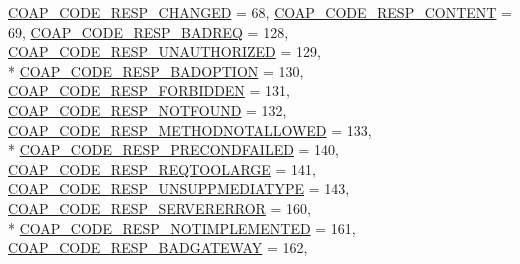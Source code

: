 \begin{DoxyCompactItemize}
\hyperlink{group__open_coap_ggae99fde61d59e68af70c6bcd0c7b0256fac980e3068cfccc3a5b3c08fc847ed349}{C\+O\+A\+P\+\_\+\+C\+O\+D\+E\+\_\+\+R\+E\+S\+P\+\_\+\+C\+H\+A\+N\+G\+ED} = 68, 
\hyperlink{group__open_coap_ggae99fde61d59e68af70c6bcd0c7b0256fa27e8e136b607d81c8f9cbbcc892db046}{C\+O\+A\+P\+\_\+\+C\+O\+D\+E\+\_\+\+R\+E\+S\+P\+\_\+\+C\+O\+N\+T\+E\+NT} = 69, 
\hyperlink{group__open_coap_ggae99fde61d59e68af70c6bcd0c7b0256facf8fb9fbc56e2053ab4ada884bbd0c09}{C\+O\+A\+P\+\_\+\+C\+O\+D\+E\+\_\+\+R\+E\+S\+P\+\_\+\+B\+A\+D\+R\+EQ} = 128, 
\hyperlink{group__open_coap_ggae99fde61d59e68af70c6bcd0c7b0256fa1e80eb762859e91ca40c6d150985069e}{C\+O\+A\+P\+\_\+\+C\+O\+D\+E\+\_\+\+R\+E\+S\+P\+\_\+\+U\+N\+A\+U\+T\+H\+O\+R\+I\+Z\+ED} = 129, 
\\*
\hyperlink{group__open_coap_ggae99fde61d59e68af70c6bcd0c7b0256fa9486b10d11f22b898c7e8ef3595c2a4b}{C\+O\+A\+P\+\_\+\+C\+O\+D\+E\+\_\+\+R\+E\+S\+P\+\_\+\+B\+A\+D\+O\+P\+T\+I\+ON} = 130, 
\hyperlink{group__open_coap_ggae99fde61d59e68af70c6bcd0c7b0256faeda5c2a149c5d007d7d881bcd368cc66}{C\+O\+A\+P\+\_\+\+C\+O\+D\+E\+\_\+\+R\+E\+S\+P\+\_\+\+F\+O\+R\+B\+I\+D\+D\+EN} = 131, 
\hyperlink{group__open_coap_ggae99fde61d59e68af70c6bcd0c7b0256fa8f34d21872bb3ab0339c9e2816a4c114}{C\+O\+A\+P\+\_\+\+C\+O\+D\+E\+\_\+\+R\+E\+S\+P\+\_\+\+N\+O\+T\+F\+O\+U\+ND} = 132, 
\hyperlink{group__open_coap_ggae99fde61d59e68af70c6bcd0c7b0256fa7d6b3f39e38f2d69ab7820772570a67f}{C\+O\+A\+P\+\_\+\+C\+O\+D\+E\+\_\+\+R\+E\+S\+P\+\_\+\+M\+E\+T\+H\+O\+D\+N\+O\+T\+A\+L\+L\+O\+W\+ED} = 133, 
\\*
\hyperlink{group__open_coap_ggae99fde61d59e68af70c6bcd0c7b0256fa640d3a42e249605e32c9b71d7d7d12cd}{C\+O\+A\+P\+\_\+\+C\+O\+D\+E\+\_\+\+R\+E\+S\+P\+\_\+\+P\+R\+E\+C\+O\+N\+D\+F\+A\+I\+L\+ED} = 140, 
\hyperlink{group__open_coap_ggae99fde61d59e68af70c6bcd0c7b0256fa07b49fa617733f4da4d503f01ad2283c}{C\+O\+A\+P\+\_\+\+C\+O\+D\+E\+\_\+\+R\+E\+S\+P\+\_\+\+R\+E\+Q\+T\+O\+O\+L\+A\+R\+GE} = 141, 
\hyperlink{group__open_coap_ggae99fde61d59e68af70c6bcd0c7b0256fa6eb39d897f3a73234b2bfa7c925ffeca}{C\+O\+A\+P\+\_\+\+C\+O\+D\+E\+\_\+\+R\+E\+S\+P\+\_\+\+U\+N\+S\+U\+P\+P\+M\+E\+D\+I\+A\+T\+Y\+PE} = 143, 
\hyperlink{group__open_coap_ggae99fde61d59e68af70c6bcd0c7b0256fac1608678da628ec577acfcbc8f1e2bb0}{C\+O\+A\+P\+\_\+\+C\+O\+D\+E\+\_\+\+R\+E\+S\+P\+\_\+\+S\+E\+R\+V\+E\+R\+E\+R\+R\+OR} = 160, 
\\*
\hyperlink{group__open_coap_ggae99fde61d59e68af70c6bcd0c7b0256fa667526f036e6721a1edd8deaf28c27bd}{C\+O\+A\+P\+\_\+\+C\+O\+D\+E\+\_\+\+R\+E\+S\+P\+\_\+\+N\+O\+T\+I\+M\+P\+L\+E\+M\+E\+N\+T\+ED} = 161, 
\hyperlink{group__open_coap_ggae99fde61d59e68af70c6bcd0c7b0256fac5f6381cb7c7351dfb5cca0ed6a5ab83}{C\+O\+A\+P\+\_\+\+C\+O\+D\+E\+\_\+\+R\+E\+S\+P\+\_\+\+B\+A\+D\+G\+A\+T\+E\+W\+AY} = 162, 

\end{DoxyCompactItemize}
